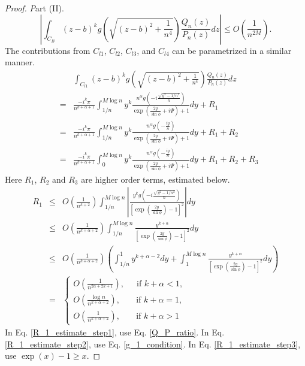 \documentclass[11pt]{article}
\begin{document}
\begin{proof} {\textit Part (II).}
\begin{equation}
    \left|\int_{C_B} (z-b)^{k} g(\sqrt{(z-b)^2+\frac{1}{n^4}}) \frac{Q_n(z)}{P_n(z)} dz\right| \leq O(\frac{1}{n^{2M}}).
\end{equation}
The contributions from $C_{l1}$, $C_{l2}$, $C_{l3}$, and $C_{l4}$ can be parametrized in a similar manner.
\begin{eqnarray}
    &&\int_{C_{l1}} (z-b)^{k} g(\sqrt{(z-b)^2+\frac{1}{n^4}}) \frac{Q_n(z)}{P_n(z)} dz\nonumber\\
    &=& \frac{-i^{k}\pi}{ n^{k+\alpha+1}}\int_{1/n}^{M\log n} y^{k} \frac{  n^\alpha g(-i\frac{\sqrt{y^2-1/n^2}}{n}) }{\exp\left(\frac{2y}{\sin\phi}+i\Psi\right) + 1} dy + R_1\\
    &=& \frac{-i^{k}\pi}{ n^{k+\alpha+1}}\int_{1/n}^{M\log n}  y^{k}\frac{ n^\alpha g(-\frac{iy}{n}) }{\exp\left(\frac{2y}{\sin\phi}+i\Psi\right) + 1} dy + R_1 + R_2\\
    &=& \frac{ -i^{k} \pi}{ n^{k+\alpha+1}}\int_{0}^{M\log n}  y^{k}\frac{ n^\alpha g(-\frac{iy}{n}) }{\exp\left(\frac{2y}{\sin\phi}+i\Psi\right) + 1} dy + R_1 + R_2 +R_3
\end{eqnarray}
Here $R_1$, $R_2$ and $R_3$ are higher order terms, estimated below.
\begin{eqnarray}
    R_1 &\leq & O(\frac{1}{ n^{k+2}})\int_{1/n}^{M\log n}  \left|\frac{ y^{k} g(-i\frac{\sqrt{y^2-1/n^2}}{n}) }{\left[\exp\left(\frac{2y}{\sin\phi}\right)-1\right]^2}  \right| dy \label{R_1_estimate_step1}\\
    &\leq& O(\frac{1}{ n^{k+\alpha+2}})\int_{1/n}^{M\log n}  \frac{ y^{k+\alpha} }{\left[\exp\left(\frac{2y}{\sin\phi}\right)-1\right]^2} dy \label{R_1_estimate_step2}\\
    &\leq& O(\frac{1}{ n^{k+\alpha+2}})\left(\int_{1/n}^{1}  y^{k+\alpha-2} dy +\int_{1}^{M\log n}  \frac{ y^{k+\alpha} }{\left[\exp\left(\frac{2y}{\sin\phi}\right)-1\right]^2} dy\right) \label{R_1_estimate_step3}\\
    &=& \begin{cases}
        O(\frac{1}{n^{2\alpha+2k+1}}), \ \ \ \ \  \text{ if } k+\alpha <1,\\
        O(\frac{\log n}{n^{k+\alpha+2}}), \ \ \ \ \ \ \ \text{ if } k+\alpha =1,\\
        O(\frac{1}{n^{k+\alpha+2}}),\ \ \ \ \ \ \  \text{ if }  k+\alpha >1
    \end{cases} \label{R_1_estimate}
\end{eqnarray}
In Eq. \eqref{R_1_estimate_step1}, use Eq. \eqref{Q_P_ratio}. In Eq. \eqref{R_1_estimate_step2}, use Eq. \eqref{g_1_condition}. In Eq. \eqref{R_1_estimate_step3}, use $\exp(x)-1\geq x$.

\end{proof}
\end{document}
